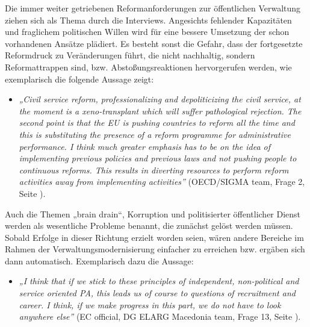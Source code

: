 Die immer weiter getriebenen Reformanforderungen zur öffentlichen Verwaltung ziehen sich als Thema durch die Interviews. Angesichts fehlender Kapazitäten und fraglichem politischen Willen wird für eine bessere Umsetzung der schon vorhandenen Ansätze plädiert. Es besteht sonst die Gefahr, dass der fortgesetzte Reformdruck zu Veränderungen führt, die nicht nachhaltig, sondern Reformattrappen sind, bzw. Abstoßungsreaktionen hervorgerufen werden, wie exemplarisch die folgende Aussage zeigt:
\begin{itemize}[label={}]
\item \textit{„Civil service reform, professionalizing and depoliticizing the civil service, at the moment is a xeno-transplant which will suffer pathological rejection. The second point is that the EU is pushing countries to reform all the time and this is substituting the presence of a reform programme for administrative performance. I think much greater emphasis has to be on the idea of implementing previous policies and previous laws and not pushing people to continuous reforms. This results in diverting resources to perform reform activities away from implementing activities”} (OECD/SIGMA team, Frage 2, Seite \pageref{sec:view}).
\end{itemize}
Auch die Themen „brain drain“, Korruption und politisierter öffentlicher Dienst werden als wesentliche Probleme benannt, die zunächst gelöst werden müssen. Sobald Erfolge in dieser Richtung erzielt worden seien, wären andere Bereiche im Rahmen der Verwaltungsmodernisierung einfacher zu erreichen bzw. ergäben sich dann automatisch. Exemplarisch dazu die Aussage:
\begin{itemize}[label={}]
\item \textit{„I think that if we stick to these principles of independent, non-political and service oriented PA, this leads us of course to questions of recruitment and career. I think, if we make progress in this part, we do not have to look anywhere else”} (EC official, DG ELARG Macedonia team, Frage 13, Seite \pageref{sec:montenegro3}).
\end{itemize}

